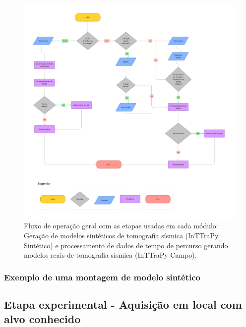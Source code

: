 \documentclass[a4paper, 12 pt]{article} %
\begin{document}
\begin{figure}[!hbtp]
	\begin{center}
		\includegraphics[scale=0.189]{Figuras/Portela_TCC.png}
	\end{center}
	\caption{Fluxo de operação geral com as etapas usadas em cada módulo: Geração de modelos sintéticos de tomografia sísmica (InTTraPy Sintético) e processamento de dados de tempo de percurso gerando modelos reais de tomografia sísmica (InTTraPy Campo).}
	\label{fluxo_grama}
\end{figure} 

\subsubsection{Exemplo de uma montagem de modelo sintético}

\blindtext 


\subsection{Etapa experimental - Aquisição em local com alvo conhecido}

\blindtext 
%
\blindtext 
%
\blindtext

\end{document}

